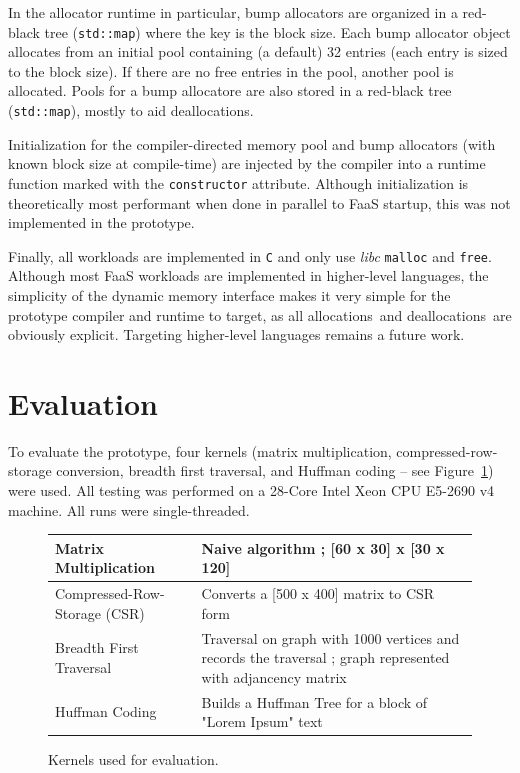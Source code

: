 \documentclass{article}
\def\ALLS{allocations}
\def\DALLS{deallocations}
\begin{document}
In the allocator runtime in particular, bump allocators are organized in a red-black tree (\texttt{std::map})
where the key is the block size. Each bump allocator object allocates from an initial pool
containing (a default) 32 entries (each entry is sized to the block size). If there are no free entries
in the pool, another pool is allocated. Pools for a bump allocatore are also stored in a 
red-black tree (\texttt{std::map}), mostly to aid \DALLS .

Initialization for the compiler-directed memory pool and bump allocators (with known block size at 
compile-time) are injected by the compiler into a runtime function marked with the \texttt{constructor}
attribute. Although initialization is theoretically most performant when done in parallel
to FaaS startup, this was not implemented in the prototype.

Finally, all workloads are implemented in \texttt{C} and only use \textit{libc} \texttt{malloc} and 
\texttt{free}. Although most FaaS workloads are implemented in higher-level languages, the 
simplicity of the dynamic memory interface makes it very simple for the prototype compiler and 
runtime to target, as all \ALLS\ and \DALLS\ are obviously explicit. Targeting higher-level 
languages remains a future work.

\section{Evaluation}
To evaluate the prototype, four kernels (matrix multiplication, compressed-row-storage conversion,
breadth first traversal, and Huffman coding -- see Figure~\ref{fig:apps}) were used. All testing
was performed on a 28-Core Intel Xeon CPU E5-2690 v4 machine. All runs were single-threaded.  

\begin{figure}
        \small
        \centering
        \begin{tabular}{ | m{5cm} | m{7cm} | } 
          \hline
            Matrix Multiplication & Naive algorithm ; [60 x 30] x [30 x 120] \\ 
          \hline
            Compressed-Row-Storage (CSR) & Converts a [500 x 400] matrix to CSR form \\ 
          \hline
            Breadth First Traversal & Traversal on graph with 1000 vertices and records the traversal ; graph represented with adjancency matrix  \\ 
          \hline
            Huffman Coding & Builds a Huffman Tree for a block of "Lorem Ipsum" text \\ 
          \hline
        \end{tabular}
        \caption{Kernels used for evaluation.}
        \label{fig:apps}
\end{figure}
\end{document}
